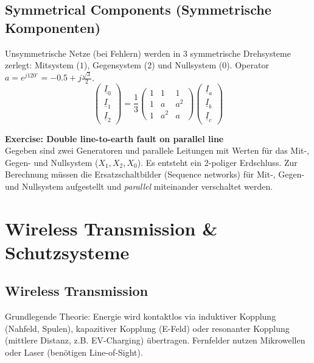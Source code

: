 \documentclass[11pt, a4paper]{article}
\begin{document}
\subsection{Symmetrical Components (Symmetrische Komponenten)}
Unsymmetrische Netze (bei Fehlern) werden in 3 symmetrische Drehsysteme zerlegt: Mitsystem ($1$), Gegensystem ($2$) und Nullsystem ($0$). Operator $a = e^{j120^\circ} = -0.5 + j\frac{\sqrt{3}}{2}$.
\begin{equation}
    \begin{pmatrix} \underline{I}_0 \\ \underline{I}_1 \\ \underline{I}_2 \end{pmatrix} = \frac{1}{3} \begin{pmatrix} 1 & 1 & 1 \\ 1 & a & a^2 \\ 1 & a^2 & a \end{pmatrix} \begin{pmatrix} \underline{I}_a \\ \underline{I}_b \\ \underline{I}_c \end{pmatrix}
\end{equation}

\begin{tcolorbox}[colback=yellow!5, title=\textbf{Übungsbeispiel (aus Symmetrical Components S. 24-28)}]
\textbf{Exercise: Double line-to-earth fault on parallel line}\\
Gegeben sind zwei Generatoren und parallele Leitungen mit Werten für das Mit-, Gegen- und Nullsystem ($X_1, X_2, X_0$).
Es entsteht ein 2-poliger Erdschluss.
Zur Berechnung müssen die Ersatzschaltbilder (Sequence networks) für Mit-, Gegen- und Nullsystem aufgestellt und \textit{parallel} miteinander verschaltet werden.
\end{tcolorbox}

\section{Wireless Transmission \& Schutzsysteme}

\subsection{Wireless Transmission}
Grundlegende Theorie: Energie wird kontaktlos via induktiver Kopplung (Nahfeld, Spulen), kapazitiver Kopplung (E-Feld) oder resonanter Kopplung (mittlere Distanz, z.B. EV-Charging) übertragen. Fernfelder nutzen Mikrowellen oder Laser (benötigen Line-of-Sight).
\end{document}
